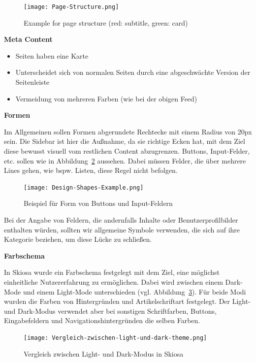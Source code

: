 \begin{figure}
    \texttt{[image: Page-Structure.png]}
    \caption{Example for page structure (red: subtitle, green: card)}
    \label{fig:Page-Structure-Example}
\end{figure}

\textbf{Meta Content}
\begin{itemize}
    \item Seiten haben eine Karte
    \item Unterscheidet sich von normalen Seiten durch eine abgeschwächte Version der Seitenleiste
    \item Vermeidung von mehreren Farben (wie bei der obigen Feed)
\end{itemize}
 
\textbf{Formen}

Im Allgemeinen sollen Formen abgerundete Rechtecke mit einem Radius von 20px sein. Die Sidebar ist hier die Außnahme, da sie richtige Ecken hat, 
mit dem Ziel diese bewusst visuell vom restlichen Content abzugrenzen.
Buttons, Input-Felder, etc. sollen wie in Abbildung~\ref{fig:Design-Shapes-Example} aussehen. 
Dabei müssen Felder, die über mehrere Lines gehen, wie bspw. Listen, diese Regel nicht befolgen.

\begin{figure}[H]
    \texttt{[image: Design-Shapes-Example.png]}
    \caption{Beispiel für Form von Buttons und Input-Feldern}
    \label{fig:Design-Shapes-Example}
\end{figure}

Bei der Angabe von Feldern, die andernfalls Inhalte oder Benutzerprofilbilder enthalten würden,
sollten wir allgemeine Symbole verwenden, die sich auf ihre Kategorie beziehen, um diese Lücke zu schließen.

\textbf{Farbschema}

In Skiosa wurde ein Farbschema festgelegt mit dem Ziel, 
eine möglichst einheitliche Nutzererfahrung zu ermöglichen. 
Dabei wird zwischen einem Dark-Mode und einem Light-Mode unterschieden (vgl. Abbildung~\ref{fig:Vergleich-light-dark}).
Für beide Modi wurden die Farben von Hintergründen und Artikelschriftart festgelegt.
Der Light- und Dark-Modus verwendet 
aber bei sonstigen Schriftfarben, Buttons, Eingabefeldern und Navigationshintergründen die selben Farben.

\begin{figure}[h]
    \texttt{[image: Vergleich-zwischen-light-und-dark-theme.png]}
    \caption{Vergleich zwischen Light- und Dark-Modus in Skiosa}
    \label{fig:Vergleich-light-dark}
\end{figure}

